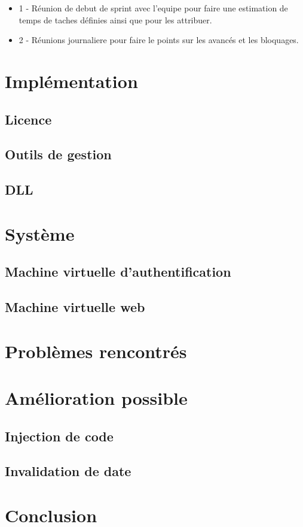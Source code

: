 \begin{itemize}
	\item 1 - Réunion de debut de sprint avec l'equipe pour faire une estimation de temps de taches définies ainsi que pour les attribuer.
	\item 2 - Réunions journaliere pour faire le points sur les avancés et les bloquages.
\end{itemize}

\chapter{Implémentation}

\section{Licence}

\section{Outils de gestion}

\section{DLL}

\chapter{Système}

\section{Machine virtuelle d'authentification}

\section{Machine virtuelle web}

\chapter{Problèmes rencontrés}

\chapter{Amélioration possible}

\section{Injection de code}

\section{Invalidation de date}

\chapter{Conclusion}
\label{chapter:bilan}

